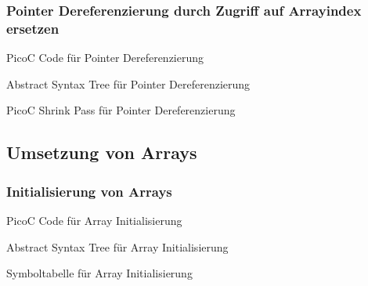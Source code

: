 \subsubsection{Pointer Dereferenzierung durch Zugriff auf Arrayindex ersetzen}
\begin{code}
  \centering
  \caption{PicoC Code für Pointer Dereferenzierung}
  \label{code:picoc_code_für_pointer_dereferenzierung}
\end{code}

\begin{code}
  \centering
  \caption{Abstract Syntax Tree für Pointer Dereferenzierung}
  \label{code:abstract_syntax_tree_für_pointer_dereferenzierung}
\end{code}

\begin{code}
  \centering
  \caption{PicoC Shrink Pass für Pointer Dereferenzierung}
  \label{code:picoc_shrink_für_pointer_dereferenzierung}
\end{code}

\subsection{Umsetzung von Arrays}
\subsubsection{Initialisierung von Arrays}
\begin{code}
  \centering
  \caption{PicoC Code für Array Initialisierung}
  \label{code:picoc_code_für_array_initialisierung}
\end{code}

\begin{code}
  \centering
  \caption{Abstract Syntax Tree für Array Initialisierung}
  \label{code:abstract_syntax_tree_für_array_initialisierung}
\end{code}

\begin{code}
  \centering
  \caption{Symboltabelle für Array Initialisierung}
  \label{code:symboltabelle_für_array_initialisierung}
\end{code}

